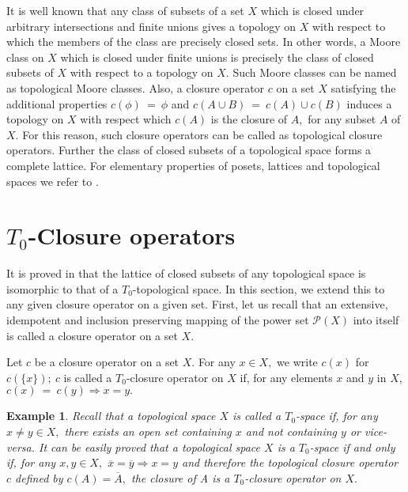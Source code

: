 \documentclass[
11pt,%
tightenlines,%
twoside,%
onecolumn,%
nofloats,%
nobibnotes,%
nofootinbib,%
superscriptaddress,%
noshowpacs,%
centertags]%
{revtex4}
\newtheorem{example}{Example}
\begin{document}
It is well known that any class of subsets of a set $X$ which is
closed under arbitrary intersections and finite unions  gives a
topology on $X$ with respect to which the members of the class are
precisely closed sets. In other words, a Moore class on $X$ which is
closed under finite unions is precisely the class of closed subsets
of $X$ with respect to a  topology on $X.$ Such Moore classes can be
named as topological Moore classes. Also, a closure  operator $c$ on
a set $X$ satisfying the additional properties $c(\phi)~=~\phi$ and
$c(A \cup B)~=~c(A) \cup c(B)$ induces a topology on $X$ with
respect which $c(A)$ is the closure of $A,$  for any subset $A$ of
$X.$ For this reason, such closure operators can be called as
topological closure operators. Further the class of closed subsets
of a topological space forms a complete lattice. For elementary
properties of  posets, lattices and topological spaces  we refer to
\cite{ 1, 2, 3, 4, 5}.


\section{$T_0$-Closure operators}\label{sec:ch4sec3}
It is proved in  \cite{6} that the lattice of closed subsets  of any
topological space is isomorphic to that of a $T_0$-topological
space. In this section, we extend this to any given closure operator
on a given set. First, let us recall that an
 extensive, idempotent and inclusion preserving mapping of the
  power set $\mathscr{P}(X)$  into itself is called a closure operator on a set $X.$

\begin{definition}
\label{ch4sec3:def1} Let $c$ be a closure operator on a set $X.$ For
any $x \in X,$  we write $c(x)$ for $c(\{x\});~c$  is called a
$T_0$-closure operator on $X$ if, for any elements $x$ and $y$ in
$X,$  $c(x)~=~c(y) \Longrightarrow x = y.$
\end{definition}

\begin{example}
\label{ch4sec3:ex2} Recall that a topological space $X$ is called a
$T_0$-space if,  for any $x \neq y \in X,$ there exists an open set
containing $x$ and not containing $y$ or vice-versa. It can be
easily proved that a topological space $X$ is a $T_0$-space if and
only if, for any $x,y \in X,$ $\overline{x}=\overline{y}
\Longrightarrow x = y $ and therefore the topological closure
operator $c$ defined by $c(A)=\overline{A}, $ the closure of A is a
$T_0$-closure operator on $X.$
\end{example}
\end{document}
